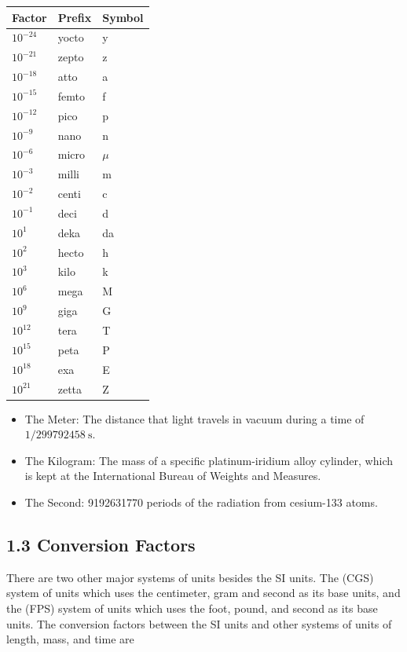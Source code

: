 \documentclass[10pt]{article}
\begin{document}
\begin{center}
\begin{tabular}{l|l|l}
\hline
Factor & Prefix & Symbol \\
\hline
$10^{-24}$ & yocto & y \\
\hline
$10^{-21}$ & zepto & z \\
\hline
$10^{-18}$ & atto & a \\
\hline
$10^{-15}$ & femto & f \\
\hline
$10^{-12}$ & pico & p \\
\hline
$10^{-9}$ & nano & n \\
\hline
$10^{-6}$ & micro & $\mu$ \\
\hline
$10^{-3}$ & milli & m \\
\hline
$10^{-2}$ & centi & c \\
\hline
$10^{-1}$ & deci & d \\
\hline
$10^{1}$ & deka & da \\
\hline
$10^{2}$ & hecto & h \\
\hline
$10^{3}$ & kilo & k \\
\hline
$10^{6}$ & mega & M \\
\hline
$10^{9}$ & giga & G \\
\hline
$10^{12}$ & tera & T \\
\hline
$10^{15}$ & peta & P \\
\hline
$10^{18}$ & exa & E \\
\hline
$10^{21}$ & zetta & Z \\
\hline
\end{tabular}
\end{center}

\begin{itemize}
  \item The Meter: The distance that light travels in vacuum during a time of $1 / 299792458 \mathrm{~s}$.
  \item The Kilogram: The mass of a specific platinum-iridium alloy cylinder, which is kept at the International Bureau of Weights and Measures.
  \item The Second: 9192631770 periods of the radiation from cesium-133 atoms.
\end{itemize}

\subsection*{1.3 Conversion Factors}
There are two other major systems of units besides the SI units. The (CGS) system of units which uses the centimeter, gram and second as its base units, and the (FPS) system of units which uses the foot, pound, and second as its base units. The conversion factors between the SI units and other systems of units of length, mass, and time are
\end{document}
